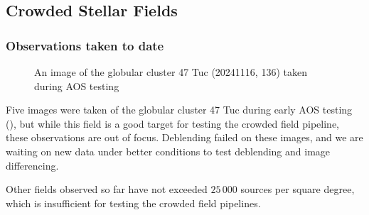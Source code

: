 \subsection{Crowded Stellar Fields}
\label{sec:crowded_stellar_fields}

\subsubsection{Observations taken to date}


\begin{figure}
  \begin{center}
  \end{center}
  \caption{An image of the globular cluster 47 Tuc (20241116, 136) taken during AOS testing}
  \label{fig:47Tuc}
\end{figure}

Five images were taken of the globular cluster 47 Tuc during early AOS testing (\eg {}),
but while this field is a good target for testing the crowded field pipeline, these observations
are out of focus. 
Deblending failed on these images, and we are waiting on new data under better conditions to test deblending and image differencing.

Other fields observed so far have not exceeded \( 25\,000 \) sources per square degree, which is insufficient for testing the crowded field pipelines.
